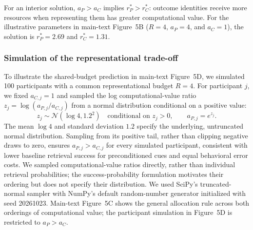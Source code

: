 \documentclass[9pt,twoside,lineno]{pnas-new}
\begin{document}
For an interior solution, $a_P>a_C$ implies $r_P^*>r_C^*$: outcome identities receive more resources when representing them has greater computational value. For the illustrative parameters in main-text Figure~5B ($R=4$, $a_P=4$, and $a_C=1$), the solution is $r_P^*=2.69$ and $r_C^*=1.31$.

\subsubsection*{Simulation of the representational trade-off}

To illustrate the shared-budget prediction in main-text Figure~5D, we simulated 100 participants with a common representational budget $R=4$. For participant $j$, we fixed $a_{C,j}=1$ and sampled the log computational-value ratio $z_j=\log(a_{P,j}/a_{C,j})$ from a normal distribution conditional on a positive value:
\begin{equation}
z_j\sim\mathcal{N}(\log 4,1.2^2)\quad\text{conditional on }z_j>0,\qquad a_{P,j}=e^{z_j}.
\tag{S7}
\end{equation}
The mean $\log 4$ and standard deviation $1.2$ specify the underlying, untruncated normal distribution. Sampling from its positive tail, rather than clipping negative draws to zero, ensures $a_{P,j}>a_{C,j}$ for every simulated participant, consistent with lower baseline retrieval success for preconditioned cues and equal behavioral error costs. We sampled computational-value ratios directly, rather than individual retrieval probabilities; the success-probability formulation motivates their ordering but does not specify their distribution. We used SciPy's truncated-normal sampler with NumPy's default random-number generator initialized with seed 20261023. Main-text Figure~5C shows the general allocation rule across both orderings of computational value; the participant simulation in Figure~5D is restricted to $a_P>a_C$.
\end{document}
